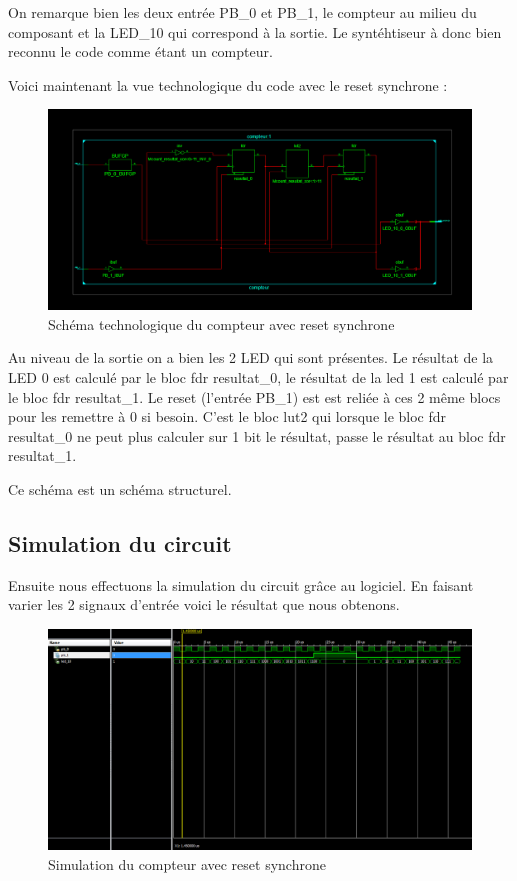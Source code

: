\documentclass[11pt]{report}
\begin{document}
On remarque bien les deux entrée PB\_0 et PB\_1, le compteur au milieu du composant et la LED\_10 qui correspond à la sortie. Le syntéhtiseur à donc bien reconnu le code comme étant un compteur.

Voici maintenant la vue technologique du code avec le reset synchrone : 

\begin{figure}[h]
\begin{center}
\includegraphics[width=15cm]{TP02-4.PNG}
\caption{Schéma technologique du compteur avec reset synchrone}
\end{center}
\end{figure}

Au niveau de la sortie on a bien les 2 LED qui sont présentes. Le résultat de la LED 0 est calculé par le bloc fdr resultat\_0, le résultat de la led 1 est calculé par le bloc fdr resultat\_1. 
Le reset (l'entrée PB\_1) est est reliée à ces 2 même blocs pour les remettre à 0 si besoin. 
C'est le bloc lut2 qui lorsque le bloc fdr resultat\_0 ne peut plus calculer sur 1 bit le résultat, passe le résultat au bloc fdr resultat\_1. 

Ce schéma est un schéma structurel.

\newpage
 
\subsection{ Simulation du circuit}

Ensuite nous effectuons la simulation du circuit grâce au logiciel. 
En faisant varier les 2 signaux d'entrée voici le résultat que nous obtenons.

\begin{figure}[h]
\includegraphics[width=15cm]{TP02-1.PNG}
\caption{Simulation du compteur avec reset synchrone}
\end{figure}
\end{document}

